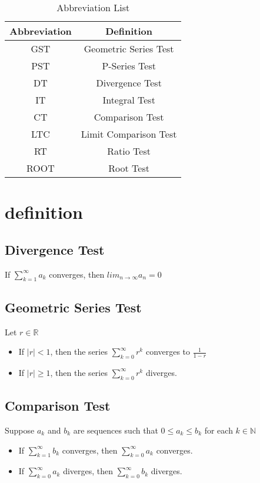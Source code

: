 \documentclass[12pt]{article}
\begin{document}
\begin{table}
\caption{Abbreviation List}
\centering
\begin{tabular}{c c}
\hline\hline
Abbreviation & Definition \\ [0.5ex]
\hline
GST & Geometric Series Test \\
PST & P-Series Test \\
DT & Divergence Test \\
IT & Integral Test \\
CT & Comparison Test \\
LTC & Limit Comparison Test \\
RT & Ratio Test \\
ROOT & Root Test \\
\hline
\end{tabular}
\label{table:abbv}
\end{table}
\section{definition}
\subsection{Divergence Test}
If $\displaystyle\sum_{k=1}^{\infty}a_k$ converges, then $lim_{n\rightarrow\infty}a_n=0$
\subsection{Geometric Series Test}
Let $r\in \mathbb{R}$
\begin{itemize}
\item If $|r|<1$, then the series $\displaystyle\sum_{k=0}^{\infty}r^k$ converges to $\frac{1}{1-r}$
\item If $|r|\ge1$, then the series $\displaystyle\sum_{k=0}^{\infty}r^k$ diverges.
\end{itemize}
\subsection{Comparison Test}
Suppose ${a_k}$ and ${b_k}$ are sequences such that $0\le{a_k}\le{b_k}$ for each $k\in \mathbb{N}$
\begin{itemize}
\item If $\displaystyle\sum_{k=1}^{\infty}b_k$ converges, then $\displaystyle\sum_{k=0}^{\infty}a_k$ converges.
\item If $\displaystyle\sum_{k=0}^{\infty}a_k$ diverges, then $\displaystyle\sum_{k=0}^{\infty}b_k$ diverges.
\end{itemize}
\end{document}

